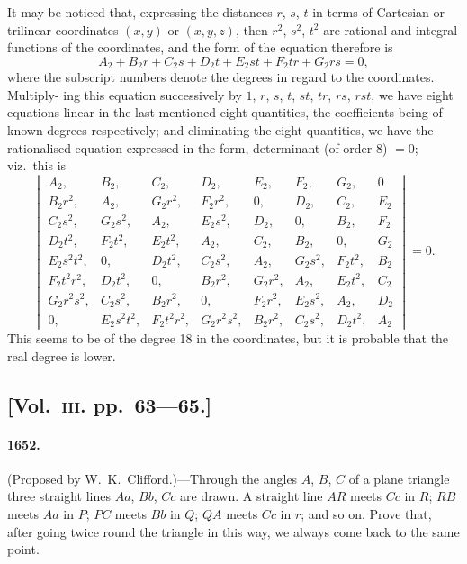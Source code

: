 \documentclass[11pt,a4paper]{article}
\begin{document}
It may be noticed that, expressing the distances $r$, $s$, $t$ in terms of Cartesian or
trilinear coordinates $(x, y)$ or $(x, y, z)$, then $r^2$, $s^2$, $t^2$ are rational and integral functions
of the coordinates, and the form of the equation therefore is
\[
A_2 + B_2r + C_2s + D_2t + E_2st + F_2tr + G_2rs = 0,
\]
where the subscript numbers denote the degrees in regard to the coordinates. Multiply-
ing this equation successively by $1$, $r$, $s$, $t$, $st$, $tr$, $rs$, $rst$, we have eight equations linear
in the last-mentioned eight quantities, the coefficients being of known degrees respectively;
and eliminating the eight quantities, we have the rationalised equation expressed in the
form, determinant (of order $8$) $=0$; viz.\ this is
\[
\begin{vmatrix}
A_2, & B_2, & C_2, & D_2, & E_2, & F_2, & G_2, & 0 \\
B_2r^2, & A_2, & G_2r^2, & F_2r^2, & 0, & D_2, & C_2, & E_2 \\
C_2s^2, & G_2s^2, & A_2, & E_2s^2, & D_2, & 0, & B_2, & F_2 \\
D_2t^2, & F_2t^2, & E_2t^2, & A_2, & C_2, & B_2, & 0, & G_2 \\
E_2s^2t^2, & 0, & D_2t^2, & C_2s^2, & A_2, & G_2s^2, & F_2t^2, & B_2 \\
F_2t^2r^2, & D_2t^2, & 0, & B_2r^2, & G_2r^2, & A_2, & E_2t^2, & C_2 \\
G_2r^2s^2, & C_2s^2, & B_2r^2, & 0, & F_2r^2, & E_2s^2, & A_2, & D_2 \\
0, & E_2s^2t^2, & F_2t^2r^2, & G_2r^2s^2, & B_2r^2, & C_2s^2, & D_2t^2, & A_2
\end{vmatrix} = 0.
\]
This seems to be of the degree 18 in the coordinates, but it is probable that the real
degree is lower.

\subsection*{[Vol.~\textsc{iii}. pp.\ 63---65.]}

\paragraph*{1652.} (Proposed by W.~K.~Clifford.)---Through the angles $A$, $B$, $C$ of a plane
triangle three straight lines $Aa$, $Bb$, $Cc$ are drawn. A straight line $AR$ meets $Cc$ in
$R$; $RB$ meets $Aa$ in $P$; $PC$ meets $Bb$ in $Q$; $QA$ meets $Cc$ in $r$; and so on. Prove
that, after going twice round the triangle in this way, we always come back to the
same point.
\end{document}
